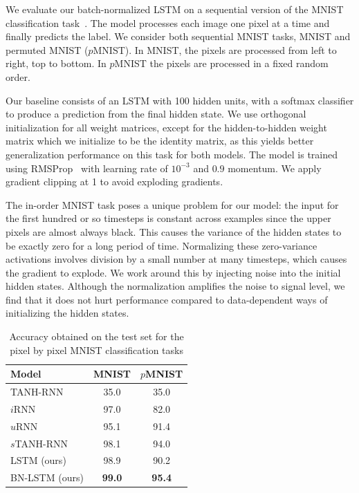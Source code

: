 \documentclass{article} %
\begin{document}
We evaluate our batch-normalized LSTM on a sequential version of the MNIST classification task~\cite{le2015simple}.
The model processes each image one pixel at a time and finally predicts the label.
We consider both sequential MNIST tasks, MNIST and permuted MNIST ($p$MNIST).
In MNIST, the pixels are processed from left to right, top to bottom.
In $p$MNIST the pixels are processed in a fixed random order.

Our baseline consists of an LSTM with 100 hidden units, with a softmax classifier to produce a prediction from the final hidden state.
We use orthogonal initialization for all weight matrices, except for the hidden-to-hidden weight matrix which we initialize to be the identity matrix,
as this yields better generalization performance on this task for both models.
The model is trained using RMSProp~\cite{rmsprop} with learning rate of $10^{-3}$ and $0.9$ momentum.
We apply gradient clipping at 1 to avoid exploding gradients.

The in-order MNIST task poses a unique problem for our model:
the input for the first hundred or so timesteps is constant across examples since the upper pixels are almost always black.
This causes the variance of the hidden states to be exactly zero for a long period of time.
Normalizing these zero-variance activations involves division by a small number at many timesteps, which causes the gradient to explode.
We work around this by injecting noise into the initial hidden states.
Although the normalization amplifies the noise to signal level, we find that it does not hurt performance compared to data-dependent ways of initializing the hidden states.


\begin{table}
\center
\begin{tabular}{@{}lcc@{}}
  \toprule
  \bf Model & \bf MNIST & \bf $p$MNIST \\
  \midrule
  TANH-RNN~\cite{le2015simple} & 35.0 & 35.0\\
  $i$RNN~\cite{le2015simple} & 97.0 & 82.0\\
  $u$RNN~\cite{urnn} & 95.1 & 91.4\\
  $s$TANH-RNN~\cite{zhang2016architectural} & 98.1 & 94.0\\
  \midrule
  LSTM (ours) & 98.9 & 90.2\\
  BN-LSTM (ours) & \textbf{99.0} & \textbf{95.4}\\
  \bottomrule
\end{tabular}
\caption{Accuracy obtained on the test set for the pixel by pixel MNIST classification tasks}
\label{tab:seqmnist_test}

\end{table}
\end{document}
